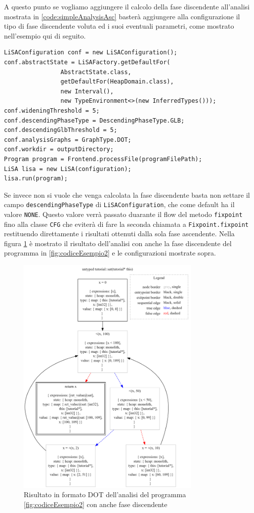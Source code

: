 A questo punto se vogliamo aggiungere il calcolo della fase discendente all'analisi mostrata in \ref{code:simpleAnalysisAsc} basterà aggiungere alla configurazione il tipo di fase discendente voluta ed i suoi eventuali parametri, come mostrato nell'esempio qui di seguito. 
\begin{lstlisting}[belowskip=-1.1 \baselineskip]
LiSAConfiguration conf = new LiSAConfiguration();
conf.abstractState = LiSAFactory.getDefaultFor(
				AbstractState.class, 
				getDefaultFor(HeapDomain.class), 
				new Interval(),
				new TypeEnvironment<>(new InferredTypes()));
conf.wideningThreshold = 5;
conf.descendingPhaseType = DescendingPhaseType.GLB;
conf.descendingGlbThreshold = 5;
conf.analysisGraphs = GraphType.DOT;
conf.workdir = outputDirectory;
Program program = Frontend.processFile(programFilePath);
LiSA lisa = new LiSA(configuration);
lisa.run(program);
\end{lstlisting}
Se invece non si vuole che venga calcolata la fase discendente basta non settare il campo \texttt{descendingPhaseType} di \texttt{LiSAConfiguration}, che come default ha il valore \texttt{NONE}. Questo valore verrà passato duarante il flow del metodo \texttt{fixpoint} fino alla classe \texttt{CFG} che eviterà di fare la seconda chiamata a \texttt{Fixpoint.fixpoint} restituendo direttamente i risultati ottenuti dalla sola fase ascendente. Nella figura \ref{fig:risultatoDOTDesc} è mostrato il risultato dell'analisi con anche la fase discendente del programma in \ref{fig:codiceEsempio2} e le configurazioni mostrate sopra.
\begin{figure}[ht]
	\centering
	\includegraphics[width=0.8\textwidth]{Immagini/graphvizDesc.png}
	\caption{Risultato in formato DOT dell'analisi del programma \ref{fig:codiceEsempio2} con anche fase discendente}
	\label{fig:risultatoDOTDesc}
\end{figure}

